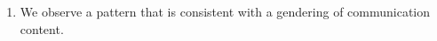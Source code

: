 \documentclass[fleqn]{MJDArticle}
\begin{document}
\begin{enumerate}
\item We observe a pattern that is consistent with a gendering of communication content.	
	
	
\end{enumerate}









\end{document}

